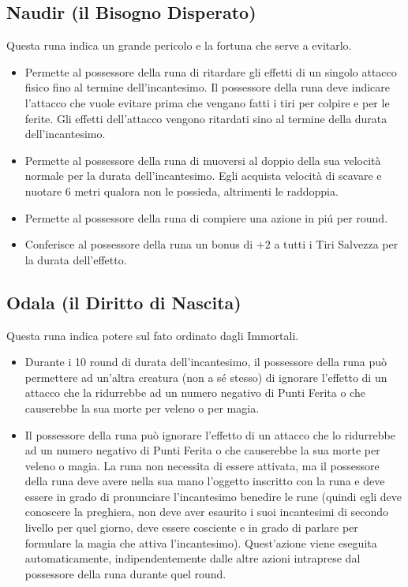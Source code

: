 \documentclass[10pt,a4paper]{article}
\begin{document}
 
\subsection*{Naudir (il Bisogno Disperato)}
 
Questa runa indica un grande pericolo e la fortuna che serve a evitarlo.
  \begin{itemize}
\item       Permette al possessore della runa di ritardare gli effetti di un singolo attacco fisico fino al termine dell'incantesimo. Il possessore della runa deve indicare l'attacco che vuole evitare prima che vengano fatti i tiri per colpire e per le ferite. Gli effetti dell'attacco vengono ritardati sino al termine della durata dell'incantesimo.
 
\item       Permette al possessore della runa di muoversi al doppio della sua velocit\`{a} normale per la durata dell'incantesimo. Egli acquista velocit\`{a} di scavare e nuotare 6 metri qualora non le possieda, altrimenti le raddoppia.

\item		Permette al possessore della runa di compiere una azione in pi\'{u} per round.
 
\item       Conferisce al possessore della runa un bonus di $+2$ a tutti i Tiri Salvezza per la durata dell'effetto.
 \end{itemize}
 
 
\subsection*{Odala (il Diritto di Nascita)}
 
Questa runa indica potere sul fato ordinato dagli Immortali.
  \begin{itemize}
\item       Durante i 10 round di durata dell'incantesimo, il possessore della runa pu\`{o} permettere ad un'altra creatura (non a s\'{e} stesso) di ignorare l'effetto di un attacco che la ridurrebbe ad un numero negativo di Punti Ferita o che causerebbe la sua morte per veleno o per magia.
 
\item       Il possessore della runa pu\`{o} ignorare l'effetto di un attacco che lo ridurrebbe ad un numero negativo di Punti Ferita o che causerebbe la sua morte per veleno o magia. La runa non necessita di essere attivata, ma il possessore della runa deve avere nella sua mano l'oggetto inscritto con la runa e deve essere in grado di pronunciare l'incantesimo benedire le rune (quindi egli deve conoscere la preghiera, non deve aver esaurito i suoi incantesimi di secondo livello per quel giorno, deve essere cosciente e in grado di parlare per formulare la magia che attiva l'incantesimo). Quest'azione viene eseguita automaticamente, indipendentemente dalle altre azioni intraprese dal possessore della runa durante quel round.
 \end{itemize}
 
\end{document}
